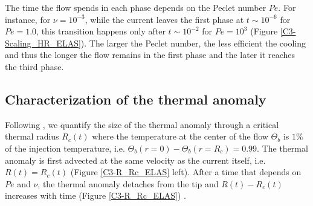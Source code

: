 The time  the flow spends in  each phase depends on  the Peclet number
$Pe$.  For instance,  for $\nu=10^{-3}$, while the  current leaves the
first phase at $t \sim 10^{-6}$ for $Pe =1.0$, this transition happens
only   after   $t   \sim   10^{-2}$    for   $Pe   =   10^3$   (Figure
\ref{C3-Scaling_HR_ELAS}).   The larger  the Peclet  number, the  less
efficient the  cooling and  thus the  longer the  flow remains  in the
first phase and the later it reaches the third phase.

\subsection{Characterization of the thermal anomaly}
\label{C3-sec:char-therm-anom-e}

Following \citet{Garel:2012bh},  we quantify  the size of  the thermal
anomaly  through   a  critical  thermal  radius   $R_c(t)$  where  the
temperature  at the  center of  the flow  $\Theta_b$ is  $1\%$ of  the
injection temperature,  i.e.  $\Theta_b(r=0)-\Theta_b(r=R_c)  = 0.99$.
The thermal  anomaly is  first advected  at the  same velocity  as the
current  itself,  i.e.   $R(t) =  R_c(t)$  (Figure  \ref{C3-R_Rc_ELAS}
left).   After a  time that  depends on  $Pe$ and  $\nu$, the  thermal
anomaly detaches  from the tip  and $R(t)-R_c(t)$ increases  with time
(Figure \ref{C3-R_Rc_ELAS}) .

